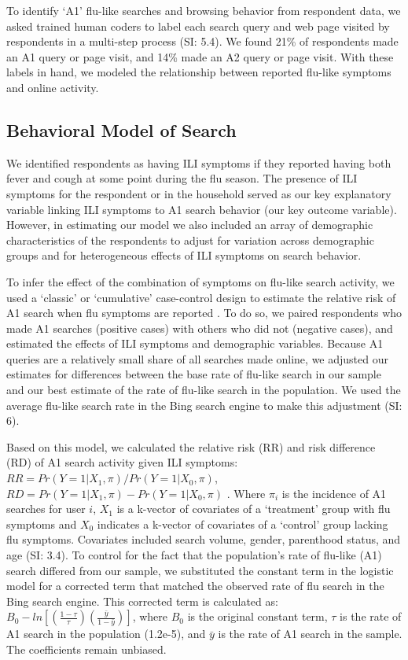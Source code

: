 \documentclass[fleqn,10pt]{wlscirep}
\begin{document}
To identify `A1' flu-like searches and browsing behavior from respondent data, we asked trained human coders to label each search query and web page visited by respondents in a multi-step process (SI: 5.4). We found 21\% of respondents made an A1 query or page visit, and 14\% made an A2 query or page visit. With these labels in hand, we modeled the relationship between reported flu-like symptoms and online activity.

\subsection*{Behavioral Model of Search}

We identified respondents as having ILI symptoms if they reported having both fever and cough at some point during the flu season. The presence of ILI symptoms for the respondent or in the household served as our key explanatory variable linking ILI symptoms to A1 search behavior (our key outcome variable). However, in estimating our model we also included an array of demographic characteristics of the respondents to adjust for variation across demographic groups and for heterogeneous effects of ILI symptoms on search behavior.

To infer the effect of the combination of symptoms on flu-like search activity, we used a `classic' or `cumulative' case-control design to estimate the relative risk of A1 search when flu symptoms are reported \cite{king_and_zeng_2001}. To do so, we paired respondents who made A1 searches (positive cases) with others who did not (negative cases), and estimated the effects of ILI symptoms and demographic variables. Because A1 queries are a relatively small share of all searches made online, we adjusted our estimates for differences between the base rate of flu-like search in our sample and our best estimate of the rate of flu-like search in the population. We used the average flu-like search rate in the Bing search engine to make this adjustment (SI: 6). 

Based on this model, we calculated the relative risk (RR) and risk difference (RD) of A1 search activity given ILI symptoms: $ RR = Pr(Y=1|X_1, \pi) / Pr(Y=1|X_0, \pi) $, $ RD = Pr(Y=1|X_1, \pi) - Pr(Y=1|X_0, \pi) $ \cite{king_and_zeng_2001}. Where $\pi_i$ is the incidence of A1 searches for user $i$, $X_1$ is a k-vector of covariates of a `treatment' group with flu symptoms and $X_0$ indicates a k-vector of covariates of a `control' group lacking flu symptoms. Covariates included search volume, gender, parenthood status, and age (SI: 3.4). To control for the fact that the population's rate of flu-like (A1) search differed from our sample, we substituted the constant term in the logistic model for a corrected term that matched the observed rate of flu search in the Bing search engine. This corrected term is calculated as: $B_0 - ln[ (\frac{1-\tau}{\tau}) (\frac{\bar{y}}{1-\bar{y}}) ]$, where $B_0$ is the original constant term, $\tau$ is the rate of A1 search in the population (1.2e-5), and $\bar{y}$ is the rate of A1 search in the sample. The coefficients remain unbiased. 
\end{document}
